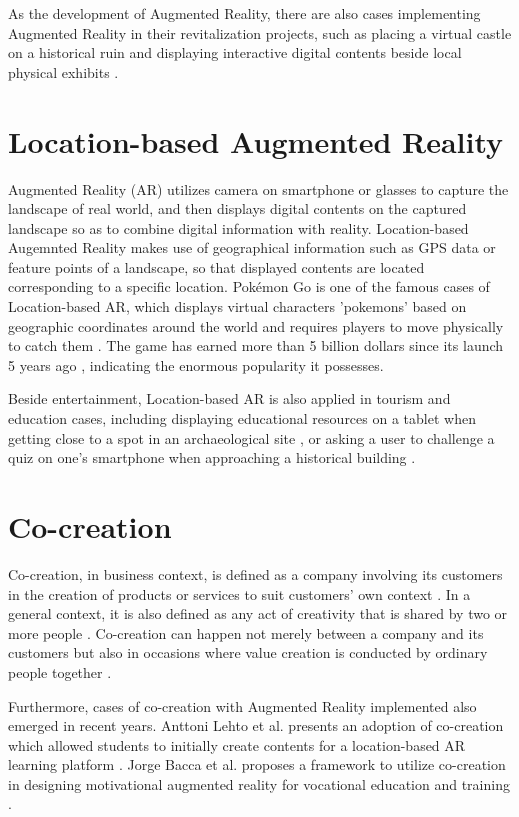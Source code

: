 As the development of Augmented Reality, there are also cases implementing Augmented Reality in their revitalization projects,
such as placing a virtual castle on a historical ruin \cite{井上道哉_長澤可也_2021} and displaying interactive digital contents beside local physical exhibits \cite{センチメンタル価値再生_2016}\cite{armarker_and_behavior_log_2011}.

\section{Location-based Augmented Reality}
Augmented Reality (AR) utilizes camera on smartphone or glasses to capture the landscape of real world,
and then displays digital contents on the captured landscape so as to combine digital information with reality.
Location-based Augemnted Reality makes use of geographical information such as GPS data or feature points of a landscape,
so that displayed contents are located corresponding to a specific location.
Pokémon Go is one of the famous cases of Location-based AR, which displays virtual characters 'pokemons' based on geographic coordinates around the world and requires players to move physically to catch them \cite{pokemongo_homepage}.
The game has earned more than 5 billion dollars since its launch 5 years ago \cite{strategist_2021}, indicating the enormous popularity it possesses.

Beside entertainment, Location-based AR is also applied in tourism and education cases,
including displaying educational resources on a tablet when getting close to a spot in an archaeological site \cite{law_2018},
or asking a user to challenge a quiz on one's smartphone when approaching a historical building \cite{hwang_chang_chen_chen_2017}.

\section{Co-creation}
Co-creation, in business context, is defined as a company involving its customers in the creation of products or services to suit customers' own context \cite{cocreation_definition}.
In a general context, it is also defined as any act of creativity that is shared by two or more people \cite{cocreation_definition_general}.
Co-creation can happen not merely between a company and its customers but also in occasions where value creation is conducted by ordinary people together \cite{cocreation_general_case}.

Furthermore, cases of co-creation with Augmented Reality implemented also emerged in recent years.
Anttoni Lehto et al. presents an adoption of co-creation which allowed students to initially create contents for a location-based AR learning platform \cite{lehto_lautkankare_brander_ala-nissila_saari_salminen_2020}.
Jorge Bacca et al. proposes a framework to utilize co-creation in designing motivational augmented reality for vocational education and training \cite{acosta_navarro_gesa_kinshuk_2019}.
